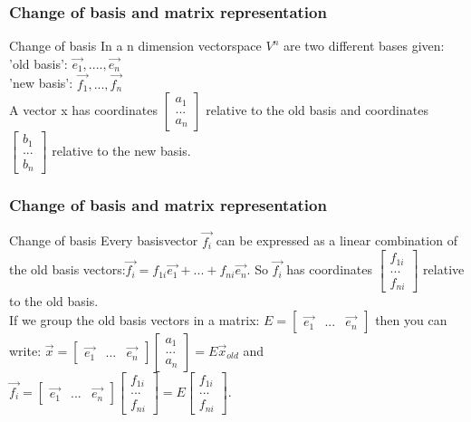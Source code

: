 \begin{frame}
	\frametitle{Change of basis and matrix representation}
	\begin{block}{Change of basis}
		In a n dimension vectorspace $V^n$ are two different bases given:\\
		'old basis': $\overrightarrow{e_1},....,\overrightarrow{e_n}$\\
		'new basis': $\overrightarrow{f_1},...,\overrightarrow{f_n}$\\
		A vector x has coordinates $\begin{bmatrix} a_1\\...\\a_n\end{bmatrix}$ relative to the old basis and coordinates $\begin{bmatrix} b_1\\...\\b_n\end{bmatrix}$ relative to the new basis.
	\end{block}
\end{frame}

\begin{frame}
	\frametitle{Change of basis and matrix representation}
	\begin{block}{Change of basis}
		Every basisvector $\overrightarrow{f_i}$ can be expressed as a linear combination of the old basis vectors:$\overrightarrow{f_i}=f_{1i}\overrightarrow{e_1}+...+f_{ni}\overrightarrow{e_n}$. So $\overrightarrow{f_i}$ has coordinates $\begin{bmatrix} f_{1i}\\...\\f_{ni}
		\end{bmatrix}$ relative to the old basis.\\
		If we group the old basis vectors in a matrix:
		$E=\begin{bmatrix} \overrightarrow{e_1} & ... & \overrightarrow{e_n} \end{bmatrix}$ then you can write: $\overrightarrow{x}=\begin{bmatrix} \overrightarrow{e_1} & ... & \overrightarrow{e_n} \end{bmatrix} \begin{bmatrix} a_1 \\ ... \\ a_n \end{bmatrix}=E\overrightarrow{x}_{old}$ and $\overrightarrow{f_i}=\begin{bmatrix} \overrightarrow{e_1} & ... & \overrightarrow{e_n} \end{bmatrix} \begin{bmatrix} f_{1i} \\ ... \\ f_{ni} \end{bmatrix}=E\begin{bmatrix} f_{1i} \\ ... \\ f_{ni} \end{bmatrix}$.
	\end{block}
\end{frame}

